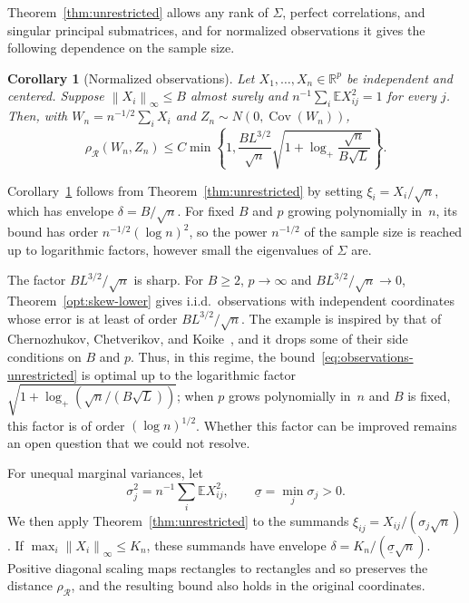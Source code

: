 \documentclass[11pt,letterpaper]{article}
\newif\ifshowrev
\newcommand{\rev}[1]{\ifshowrev{\color{revblue}%
\hypersetup{linkcolor=revblue,citecolor=revblue,urlcolor=revblue}#1}\else#1\fi}
\newif\ifshowintro
\newcommand{\itx}[1]{\ifshowintro{\color{revblue}%
\hypersetup{linkcolor=revblue,citecolor=revblue,urlcolor=revblue}#1}\else#1\fi}
\newtheorem{corollary}{Corollary}
\theoremstyle{remark}
\newcommand{\E}{\mathbb E}
\newcommand{\R}{\mathbb R}
\newcommand{\Cov}{\operatorname{Cov}}
\newcommand{\norm}[1]{\left\lVert#1\right\rVert}
\newcommand{\rh}{\rho_{\mathcal R}}
\begin{document}
\rev{Theorem~\ref{thm:unrestricted} allows any \itx{rank of \(\Sigma\)}, perfect
correlations, and singular principal submatrices, and for normalized
observations it gives the following dependence on the sample size.}

\begin{corollary}[Normalized observations]\label{cor:observations}
Let \(X_1,\ldots,X_n\in\R^p\) be independent and centered. Suppose
\(\norm{X_i}_\infty\le B\) almost surely and
\(n^{-1}\sum_i\E X_{ij}^2=1\) for every \(j\). Then, with
\(W_n=n^{-1/2}\sum_iX_i\) and \(Z_n\sim N(0,\Cov(W_n))\),
\begin{equation}
 \rh(W_n,Z_n)\le C\min\!\left\{1,
 \frac{B L^{3/2}}{\sqrt n}
 \sqrt{1+\log_+\frac{\sqrt n}{B\sqrt L}}\right\}.
 \label{eq:observations-unrestricted}
\end{equation}
\end{corollary}

\rev{Corollary~\ref{cor:observations} \itx{follows from} Theorem~\ref{thm:unrestricted}
\itx{by setting} \(\xi_i=X_i/\sqrt n\)\itx{, which has envelope \(\delta=B/\sqrt n\). For}
fixed \(B\) and \itx{\(p\) growing polynomially in~\(n\), its} bound has
order \(n^{-1/2}(\log n)^2\), so the \itx{power} \(n^{-1/2}\) of the
sample size is \itx{reached} up to logarithmic factors, however small the
\itx{eigenvalues of \(\Sigma\)} are.}

\itx{The factor \(BL^{3/2}/\sqrt n\) is sharp. For \(B\ge2\), \(p\to\infty\) and
\(BL^{3/2}/\sqrt n\to0\), Theorem~\ref{opt:skew-lower} gives i.i.d.\ observations
with independent coordinates whose error is at least of order
\(BL^{3/2}/\sqrt n\). The example is inspired by that of Chernozhukov,
Chetverikov, and Koike~\cite[Proposition~2.1]{CCK}, and it drops some of their
side conditions on \(B\) and \(p\). Thus, in this regime, the
bound~\eqref{eq:observations-unrestricted} is optimal up to the logarithmic
factor \(\sqrt{1+\log_+(\sqrt n/(B\sqrt L))}\); when \(p\) grows polynomially
in~\(n\) and \(B\) is fixed, this factor is of order \((\log n)^{1/2}\). Whether
this factor can be improved remains an open question that we could not
resolve.}

For unequal marginal variances, \itx{let}
\[
 \sigma_j^2=n^{-1}\sum_i\E X_{ij}^2,
 \qquad
 \underline\sigma=\min_j\sigma_j>0.
\]
\itx{We then apply Theorem~\ref{thm:unrestricted} to the summands
\(\xi_{ij}=X_{ij}/(\sigma_j\sqrt n)\).} If
\(\max_i\norm{X_i}_\infty\le K_n\), \itx{these} summands have
envelope \(\delta=K_n/(\underline\sigma\sqrt n)\).
Positive diagonal scaling \itx{maps rectangles to rectangles and so} preserves
\itx{the distance \(\rh\), and} the resulting bound also \itx{holds} in the
original coordinates.
\end{document}
